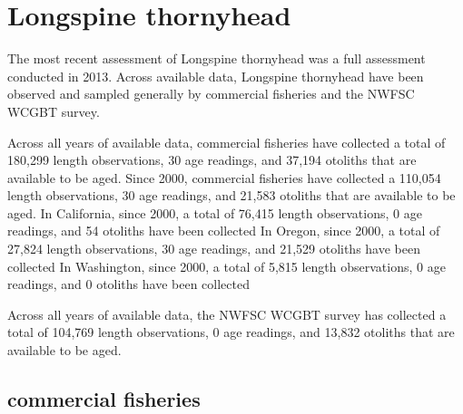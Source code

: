 \documentclass[11pt,
  english,
  letterpaper,
]{article}
\begin{document}

\hypertarget{longspine-thornyhead}{%
\section{Longspine thornyhead}\label{longspine-thornyhead}}

\leavevmode\tagmcend\tagstructend


The most recent assessment of Longspine thornyhead was a full assessment conducted in 2013. Across available data, Longspine thornyhead have been observed and sampled generally by commercial fisheries and the NWFSC WCGBT survey.

\leavevmode\tagmcend\tagstructend\par


Across all years of available data, commercial fisheries have collected a total of 180,299 length observations, 30 age readings, and 37,194 otoliths that are available to be aged. Since 2000, commercial fisheries have collected a 110,054 length observations, 30 age readings, and 21,583 otoliths that are available to be aged. In California, since 2000, a total of 76,415 length observations, 0 age readings, and 54 otoliths have been collected In Oregon, since 2000, a total of 27,824 length observations, 30 age readings, and 21,529 otoliths have been collected In Washington, since 2000, a total of 5,815 length observations, 0 age readings, and 0 otoliths have been collected

\leavevmode\tagmcend\tagstructend\par


Across all years of available data, the NWFSC WCGBT survey has collected a total of 104,769 length observations, 0 age readings, and 13,832 otoliths that are available to be aged.

\leavevmode\tagmcend\tagstructend\par


\hypertarget{commercial-fisheries-30}{%
\subsection{commercial fisheries}\label{commercial-fisheries-30}}
\end{document}
